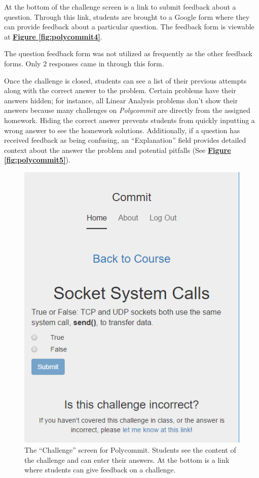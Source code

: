 \par At the bottom of the challenge screen is a link to submit feedback about a question. Through this link, students are brought to a Google form where they can provide feedback about a particular question. The feedback form is viewable at \textbf{\hyperref[fig:polycommit4]{Figure \ref*{fig:polycommit4}}}.

\par The question feedback form was not utilized as frequently as the other feedback forms. Only 2 responses came in through this form.

\par Once the challenge is closed, students can see a list of their previous attempts along with the correct answer to the problem. Certain problems have their answers hidden; for instance, all Linear Analysis problems don't show their answers because many challenges on \textit{Polycommit} are directly from the assigned homework. Hiding the correct answer prevents students from quickly inputting a wrong answer to see the homework solutions. Additionally, if a question has received feedback as being confusing, an ``Explanation'' field provides detailed context about the answer the problem and potential pitfalls (See  \textbf{\hyperref[fig:polycommit5]{Figure \ref*{fig:polycommit5}}}).

\begin{figure}
	\includegraphics{figures/pc-question}
	\caption{The ``Challenge'' screen for Polycommit. Students see the content of the challenge and can enter their answers. At the bottom is a link where students can give feedback on a challenge.}
	\label{fig:polycommit3}
\end{figure}


